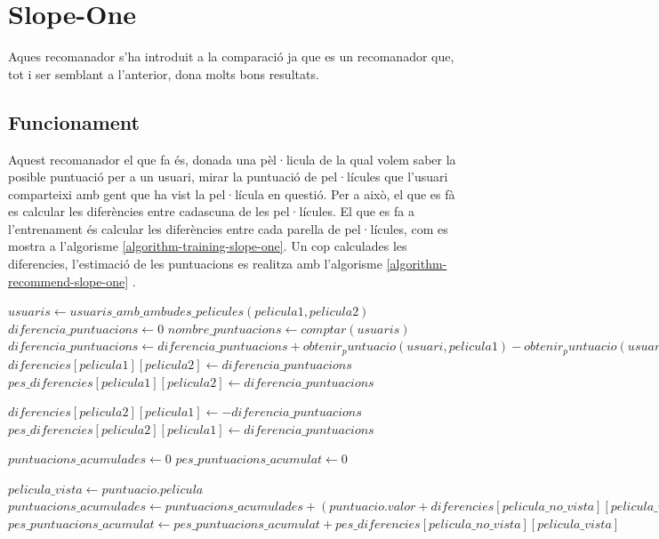 \section{Slope-One}

Aques recomanador s'ha introduit a la comparació ja que es un recomanador que, tot i ser semblant a l'anterior, dona molts bons resultats.

\subsection{Funcionament}

Aquest recomanador el que fa és, donada una pèl·licula de la qual volem saber la posible puntuació per a un usuari, mirar la puntuació de pel·lícules que l'usuari comparteixi amb gent que ha vist la pel·lícula en questió. Per a això, el que es fà es calcular les diferències entre cadascuna de les pel·lícules. El que es fa a l'entrenament és calcular les diferències entre cada parella de pel·lícules, com es mostra a l'algorisme \ref{algorithm-training-slope-one}. Un cop calculades les diferencies, l'estimació de les puntuacions es realitza amb l'algorisme \ref{algorithm-recommend-slope-one} \cite{slope-one-wiki}.


\begin{algorithm}
\caption{Entrenament del Slope-One}
\label{algorithm-training-slope-one}
\begin{algorithmic}
\State $usuaris \gets usuaris\_amb\_ambudes\_pelicules(pelicula1, pelicula2)$
\State $diferencia\_puntuacions \gets 0$
\State $nombre\_puntuacions \gets comptar(usuaris)$
	\State $diferencia\_puntuacions \gets diferencia\_puntuacions + obtenir_puntuacio(usuari, pelicula1) - obtenir_puntuacio(usuari, pelicula2)$
\EndFor
\State $diferencies[pelicula1][pelicula2] \gets diferencia\_puntuacions$
\State $pes\_diferencies[pelicula1][pelicula2] \gets diferencia\_puntuacions$

\State $diferencies[pelicula2][pelicula1] \gets - diferencia\_puntuacions$
\State $pes\_diferencies[pelicula2][pelicula1] \gets diferencia\_puntuacions$
\end{algorithmic}
\end{algorithm}

\begin{algorithm}
\caption{Recomanació del Slope-One}
\label{algorithm-recommend-slope-one}
\begin{algorithmic}
\State $puntuacions\_acumulades \gets 0$
\State $pes\_puntuacions\_acumulat \gets 0$

	\State $pelicula\_vista \gets puntuacio.pelicula$
	\State $puntuacions\_acumulades \gets puntuacions\_acumulades + (puntuacio.valor + diferencies[pelicula\_no\_vista][pelicula\_vista]) \times pes\_diferencies[pelicula\_no\_vista][pelicula\_vista]$
	\State $pes\_puntuacions\_acumulat \gets pes\_puntuacions\_acumulat + pes\_diferencies[pelicula\_no\_vista][pelicula\_vista]$
\EndFor


\end{algorithmic}
\end{algorithm}

